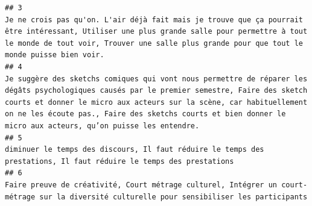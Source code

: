 \documentclass[
]{article}
\begin{document}
\begin{verbatim}
## 3                                                                                                                                                                                                                                                                                                                                                                                                                        Je ne crois pas qu'on. L'air déjà fait mais je trouve que ça pourrait être intéressant, Utiliser une plus grande salle pour permettre à tout le monde de tout voir, Trouver une salle plus grande pour que tout le monde puisse bien voir.
## 4                                                                                                                                                                                                                                                                                                                              Je suggère des sketchs comiques qui vont nous permettre de réparer les dégâts psychologiques causés par le premier semestre, Faire des sketch courts et donner le micro aux acteurs sur la scène, car habituellement on ne les écoute pas., Faire des sketchs courts et bien donner le micro aux acteurs, qu’on puisse les entendre.
## 5                                                                                                                                                                                                                                                                                                                                                                                                                                                                                                                                                diminuer le temps des discours, Il faut réduire le temps des prestations, Il faut réduire le temps des prestations
## 6                                                                                                                                                                                                                                                                                                                                                                                                                                                                                                                      Faire preuve de créativité, Court métrage culturel, Intégrer un court-métrage sur la diversité culturelle pour sensibiliser les participants
\end{verbatim}
\end{document}

